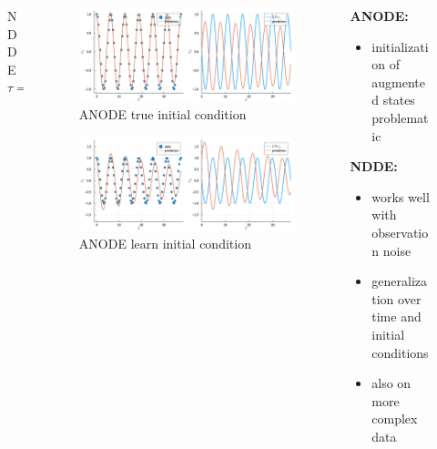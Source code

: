\documentclass[11pt,aspectratio=169]{beamer}
\begin{document}
\begin{frame}[t]
\begin{columns}[T]
\begin{column}{0.25\textwidth}
\begin{figure}
                \caption{NDDE $\tau=1, K=1$}
            \end{figure}
        \end{column}
        \begin{column}{0.5\textwidth}
            \vspace{-0.5cm}
            \begin{figure}
                \centering
                \includegraphics[width=0.9\columnwidth]{figures/anode_true_init.png}                            \vspace{-0.2cm}
                \caption{ANODE true initial condition}
            \end{figure}
            \vspace{-0.7cm}
            \begin{figure}
                \centering
                \includegraphics[width=0.9\columnwidth]{figures/anode_learn_init.png}
                                            \vspace{-0.2cm}
                \caption{ANODE learn initial condition}
            \end{figure}
        \end{column}
        \begin{column}[T]{0.25\textwidth}
            \textbf{ANODE:}
            \begin{itemize}
                \item initialization of augmented states problematic
            \end{itemize}
            \textbf{NDDE:}
            \begin{itemize}
                \item works well with observation noise
                \item generalization over time and initial conditions
                \item also on more complex data
            \end{itemize}
        \end{column}
    \end{columns}
\end{frame}
\end{document}
